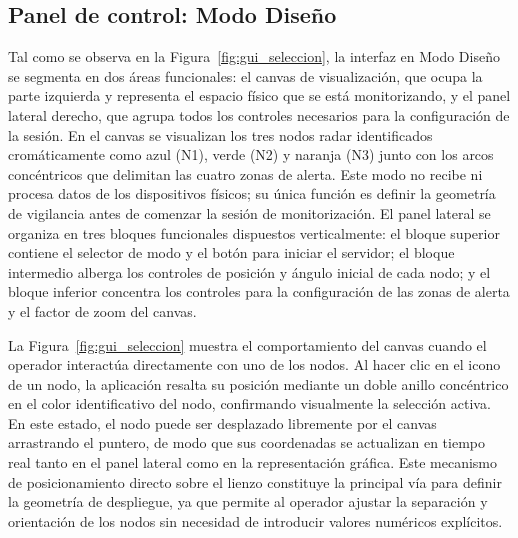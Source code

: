 \subsection{Panel de control: Modo Diseño}

Tal como se observa en la Figura~\ref{fig:gui_seleccion}, la interfaz en Modo Diseño se segmenta en dos áreas funcionales: el canvas de visualización, que ocupa la parte izquierda y representa el espacio físico que se está monitorizando, y el panel lateral derecho, que agrupa todos los controles necesarios para la configuración de la sesión. En el canvas se visualizan los tres nodos radar identificados cromáticamente como azul (N1), verde (N2) y naranja (N3) junto con los arcos concéntricos que delimitan las cuatro zonas de alerta. Este modo no recibe ni procesa datos de los dispositivos físicos; su única función es definir la geometría de vigilancia antes de comenzar la sesión de monitorización. El panel lateral se organiza en tres bloques funcionales dispuestos verticalmente: el bloque superior contiene el selector de modo y el botón para iniciar el servidor; el bloque intermedio alberga los controles de posición y ángulo inicial de cada nodo; y el bloque inferior concentra los controles para la configuración de las zonas de alerta y el factor de zoom del canvas.

La Figura~\ref{fig:gui_seleccion} muestra el comportamiento del canvas cuando el operador interactúa directamente con uno de los nodos. Al hacer clic en el icono de un nodo, la aplicación resalta su posición mediante un doble anillo concéntrico en el color identificativo del nodo, confirmando visualmente la selección activa. En este estado, el nodo puede ser desplazado libremente por el canvas arrastrando el puntero, de modo que sus coordenadas se actualizan en tiempo real tanto en el panel lateral como en la representación gráfica. Este mecanismo de posicionamiento directo sobre el lienzo constituye la principal vía para definir la geometría de despliegue, ya que permite al operador ajustar la separación y orientación de los nodos sin necesidad de introducir valores numéricos explícitos.


